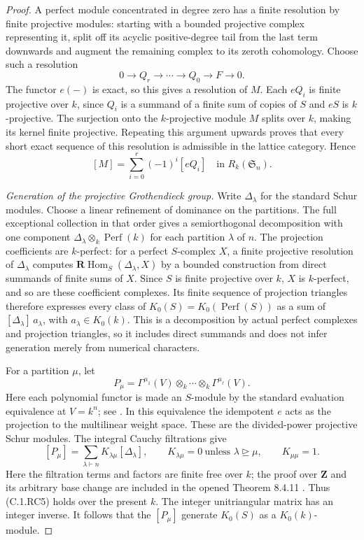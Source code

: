 \begin{proof}
A perfect module concentrated in degree zero has a finite
resolution by finite projective modules: starting with a
bounded projective complex representing it, split off its
acyclic positive-degree tail from the last term downwards
and augment the remaining complex to its zeroth cohomology.
Choose such a resolution
\[
 0\longrightarrow Q_r\longrightarrow\cdots\longrightarrow Q_0
       \longrightarrow F\longrightarrow0.
\]
The functor $e(-)$ is exact, so this gives a resolution of $M$.
Each $eQ_i$ is finite projective over $k$, since $Q_i$ is a
summand of a finite sum of copies of $S$ and $eS$ is
$k$-projective.  The surjection onto the $k$-projective module
$M$ splits over $k$, making its kernel finite projective.
Repeating this argument upwards proves that every short
exact sequence of this resolution is admissible in the
lattice category.  Hence
\[
 [M]=\sum_{i=0}^{r}(-1)^i[eQ_i]\quad\text{in }R_k(\mathfrak S_n).
                                                               \tag{C.1.RC4}
\]

\emph{Generation of the projective Grothendieck group.}
Write $\Delta_\lambda$ for the standard Schur modules.
Choose a linear refinement of dominance on the partitions.
The full exceptional collection in that order gives a semiorthogonal
decomposition with one component
$\Delta_\lambda\otimes_k\operatorname{Perf}(k)$ for each
partition $\lambda$ of $n$.
The projection coefficients are $k$-perfect: for a perfect
$S$-complex $X$, a finite projective resolution of
$\Delta_\lambda$ computes
$\mathbf R\operatorname{Hom}_S(\Delta_\lambda,X)$ by a
bounded construction from direct summands of finite sums of $X$.
Since $S$ is finite projective over $k$, $X$ is $k$-perfect,
and so are these coefficient complexes.
Its finite sequence of projection triangles therefore expresses every
class of $K_0(S)=K_0(\operatorname{Perf}(S))$ as a sum of
$[\Delta_\lambda]\,a_\lambda$, with $a_\lambda\in K_0(k)$.
This is a decomposition by actual perfect complexes and
projection triangles, so it includes direct summands and
does not infer generation merely from numerical characters.

For a partition $\mu$, let
\[
 P_\mu=\Gamma^{\mu_1}(V)\otimes_k\cdots
                   \otimes_k\Gamma^{\mu_\ell}(V).
\]
Here each polynomial functor is made an $S$-module by the
standard evaluation equivalence at $V=k^n$; see
\cite[Proposition 8.3.11]{C-KrauseSchur}.
In this equivalence the idempotent $e$ acts as the projection
to the multilinear weight space.
These are the divided-power projective Schur modules.
The integral Cauchy filtrations give
\[
 [P_\mu]=\sum_{\lambda\vdash n}K_{\lambda\mu}
             [\Delta_\lambda],
 \qquad K_{\lambda\mu}=0\ \text{unless }\lambda\unrhd\mu,
 \qquad K_{\mu\mu}=1.                                    \tag{C.1.RC5}
\]
Here the filtration terms and factors are finite free over
$k$; the proof over $\mathbf Z$ and its arbitrary base change
are included in the opened Theorem 8.4.11
\cite{C-KrauseSchur}.
Thus (C.1.RC5) holds over the present $k$.
The integer unitriangular matrix has an integer inverse.
It follows that the $[P_\mu]$ generate $K_0(S)$ as a
$K_0(k)$-module.


\end{proof}
